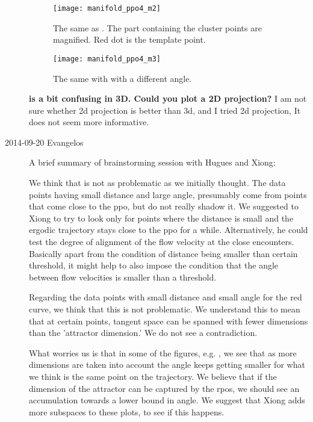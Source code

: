 \begin{description}
\begin{figure}[h]
  \centering
  \texttt{[image: manifold\_ppo4\_m2]}
  \caption{The same as . The part containing the cluster points
    are magnified. Red dot is the template point.
  }
  \label{fig:manifold_ppo4_m2}
\end{figure}

\begin{figure}[h]
  \centering
  \texttt{[image: manifold\_ppo4\_m3]}
  \caption{The same with  with a different angle.
  }
  \label{fig:manifold_ppo4_m3}
\end{figure}


\textbf{{\PoincSec} is a bit confusing in 3D. Could you plot a 2D projection?}
I am not sure whether 2d projection is better than 3d, and I tried 2d projection, It
does not seem more informative.

\item[2014-09-20 Evangelos] A brief summary of brainstorming session with Hugues and Xiong:

We think that  is not as problematic as we initially thought.
The data points having small distance and large angle, presumably come from points that come close to
the ppo, but do not really shadow it. We suggested to Xiong to try to look only for points where the distance
is small and the ergodic trajectory stays close to the ppo for a while. Alternatively, he could test the
degree of alignment of the flow velocity at the close encounters. Basically apart from the condition
of distance being smaller than certain threshold, it might help to also impose the condition that the angle between
flow velocities is smaller than a threshold.

Regarding the data points with small distance and small angle for the red curve, we think that this is not
problematic. We understand this to mean that at certain points, tangent space can be spanned with fewer dimensions
than the 'attractor dimension.' We do not see a contradiction.

What worries us is that in some of the figures, e.g. , we see that as more
dimensions are taken into account the angle keeps getting smaller for what we think is the same point on the
trajectory. We believe that if the dimension of the attractor can be captured by the rpos, we should see an accumulation
towards a lower bound in angle. We suggest that Xiong adds more subspaces to these plots, to see if this happens.


\end{description}

